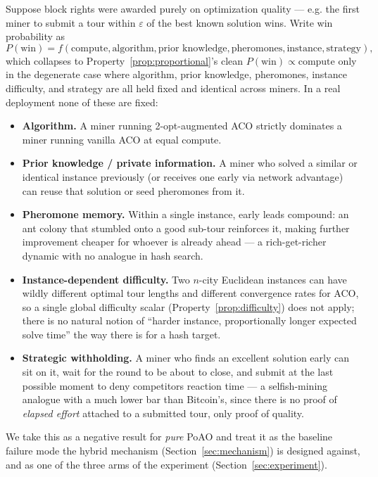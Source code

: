 \documentclass[journal]{IEEEtran}
\begin{document}
Suppose block rights were awarded purely on optimization quality --- e.g. the
first miner to submit a tour within $\varepsilon$ of the best known solution
wins. Write win probability as
\[
P(\text{win}) = f(\text{compute}, \text{algorithm}, \text{prior knowledge},
\text{pheromones}, \text{instance}, \text{strategy}),
\]
which collapses to Property~\ref{prop:proportional}'s clean
$P(\text{win}) \propto \text{compute}$ only in the degenerate case where
algorithm, prior knowledge, pheromones, instance difficulty, and strategy are
all held fixed and identical across miners. In a real deployment none of
these are fixed:

\begin{itemize}
\item \textbf{Algorithm.} A miner running 2-opt-augmented ACO strictly
dominates a miner running vanilla ACO at equal compute.
\item \textbf{Prior knowledge / private information.} A miner who solved a
similar or identical instance previously (or receives one early via network
advantage) can reuse that solution or seed pheromones from it.
\item \textbf{Pheromone memory.} Within a single instance, early leads compound:
an ant colony that stumbled onto a good sub-tour reinforces it, making
further improvement cheaper for whoever is already ahead --- a rich-get-richer
dynamic with no analogue in hash search.
\item \textbf{Instance-dependent difficulty.} Two $n$-city Euclidean instances
can have wildly different optimal tour lengths and different convergence
rates for ACO, so a single global difficulty scalar (Property~\ref{prop:difficulty})
does not apply; there is no natural notion of ``harder instance, proportionally
longer expected solve time'' the way there is for a hash target.
\item \textbf{Strategic withholding.} A miner who finds an excellent solution
early can sit on it, wait for the round to be about to close, and submit at
the last possible moment to deny competitors reaction time --- a selfish-mining
analogue with a much lower bar than Bitcoin's, since there is no proof of
\emph{elapsed effort} attached to a submitted tour, only proof of quality.
\end{itemize}

We take this as a negative result for \emph{pure} PoAO and treat it as the
baseline failure mode the hybrid mechanism (Section~\ref{sec:mechanism}) is
designed against, and as one of the three arms of the experiment
(Section~\ref{sec:experiment}).
\end{document}
